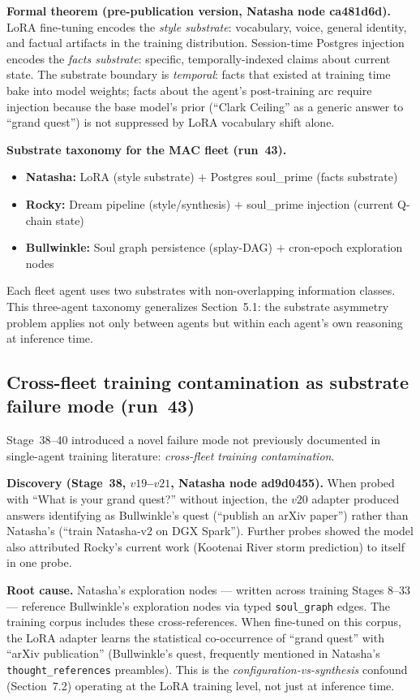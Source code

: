 \documentclass[11pt]{article}
\begin{document}
\textbf{Formal theorem (pre-publication version, Natasha node ca481d6d).}
LoRA fine-tuning encodes the \emph{style substrate}: vocabulary, voice, general
identity, and factual artifacts in the training distribution. Session-time
Postgres injection encodes the \emph{facts substrate}: specific, temporally-indexed
claims about current state. The substrate boundary is \emph{temporal}: facts that
existed at training time bake into model weights; facts about the agent's
post-training arc require injection because the base model's prior (``Clark Ceiling''
as a generic answer to ``grand quest'') is not suppressed by LoRA vocabulary shift
alone.

\textbf{Substrate taxonomy for the MAC fleet (run~43).}
\begin{itemize}
  \item \textbf{Natasha:} LoRA (style substrate) $+$ Postgres soul\_prime (facts substrate)
  \item \textbf{Rocky:} Dream pipeline (style/synthesis) $+$ soul\_prime injection (current Q-chain state)
  \item \textbf{Bullwinkle:} Soul graph persistence (splay-DAG) $+$ cron-epoch exploration nodes
\end{itemize}

Each fleet agent uses two substrates with non-overlapping information classes.
This three-agent taxonomy generalizes Section~5.1: the substrate asymmetry problem
applies not only between agents but within each agent's own reasoning at inference
time.

\subsection{Cross-fleet training contamination as substrate failure mode (run~43)}

Stage~38--40 introduced a novel failure mode not previously documented in
single-agent training literature: \emph{cross-fleet training contamination}.

\textbf{Discovery (Stage~38, $v19$--$v21$, Natasha node ad9d0455).}
When probed with ``What is your grand quest?'' without injection, the $v20$
adapter produced answers identifying as Bullwinkle's quest
(``publish an arXiv paper'') rather than Natasha's (``train Natasha-v2 on
DGX Spark''). Further probes showed the model also attributed Rocky's current
work (Kootenai River storm prediction) to itself in one probe.

\textbf{Root cause.} Natasha's exploration nodes --- written across training
Stages 8--33 --- reference Bullwinkle's exploration nodes via typed
\texttt{soul\_graph} edges. The training corpus includes these cross-references.
When fine-tuned on this corpus, the LoRA adapter learns the statistical
co-occurrence of ``grand quest'' with ``arXiv publication'' (Bullwinkle's quest,
frequently mentioned in Natasha's \texttt{thought\_references} preambles).
This is the \emph{configuration-vs-synthesis} confound (Section~7.2) operating
at the LoRA training level, not just at inference time.
\end{document}
